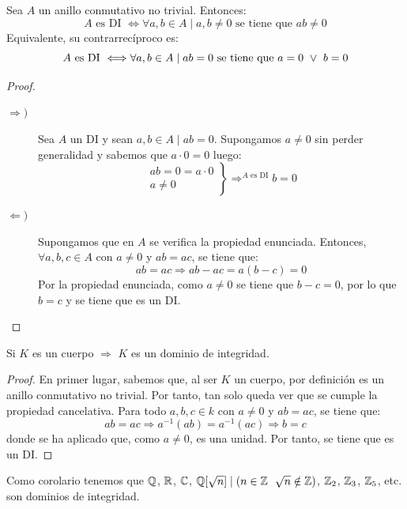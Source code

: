 \begin{prop}[Caracterización de un DI]
    Sea $A$ un anillo conmutativo no trivial. Entonces:
    $$A \text{ es DI } \Longleftrightarrow \forall a,b \in A \mid a,b \neq 0 \text{ se tiene que } ab \neq 0$$
    Equivalente, su contrarrecíproco es:
    $$A \text{ es DI } \Longleftrightarrow \forall a,b \in A \mid ab = 0 \text{ se tiene que } a = 0 \ \lor \  b = 0$$
\end{prop}
\begin{proof}\
    \begin{description}
        \item[$\Longrightarrow)$]
        Sea $A$ un DI y sean $a,b \in A \mid ab = 0$. Supongamos $a\neq 0$ sin perder generalidad y sabemos que $a \cdot 0 = 0$ luego:
        $$\left. \begin{array}{c}
            ab = 0 = a \cdot 0 \\
            a \neq 0
        \end{array} \right\} \mathop{\Longrightarrow}^{A \text{ es DI}} b=0$$
            
        \item[$\Longleftarrow)$]
        Supongamos que en $A$ se verifica la propiedad enunciada. Entonces, $\forall a,b,c \in A$ con $a\neq 0$ y $ab=ac$, se tiene que:
        $$ ab = ac \Longrightarrow ab - ac = a(b - c) = 0$$
        Por la propiedad enunciada, como $a\neq 0$ se tiene que $b-c=0$, por lo que $b=c$ y se tiene que es un DI.
    \end{description}
\end{proof}

\begin{lema}
    \label{lema:CuerpoEntoncesDominio}
    Si $K$ es un cuerpo $\Longrightarrow$ $K$ es un dominio de integridad.
\end{lema}
\begin{proof}
    En primer lugar, sabemos que, al ser $K$ un cuerpo, por definición es un anillo conmutativo no trivial.
    Por tanto, tan solo queda ver que se cumple la propiedad cancelativa. Para todo $a,b,c \in k$ con $a\neq 0$ y $ab=ac$, se tiene que:
    $$ab=ac \Longrightarrow a^{-1}(ab) = a^{-1}(ac) \Longrightarrow b=c$$
    donde se ha aplicado que, como $a\neq 0$, es una unidad. Por tanto, se tiene que es un DI.
\end{proof}


Como corolario tenemos que $\mathbb Q$, $\mathbb R$, $\mathbb C$, $\mathbb Q[\sqrt{n}] \mid (n \in \mathbb Z~~\sqrt{n} \notin \mathbb Z)$, $\mathbb Z_2$, $\mathbb Z_3$, $\mathbb Z_5$, etc. son dominios de integridad.

